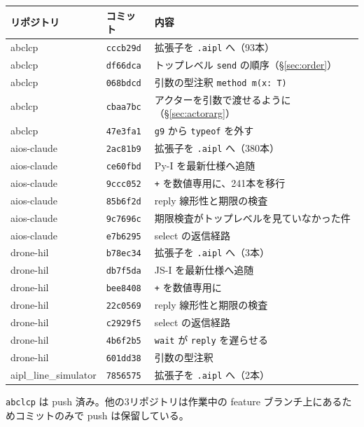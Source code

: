 \documentclass[11pt,a4paper]{ltjsarticle}
\begin{document}
\begin{center}
\small
\begin{longtable}{@{}lll@{}}
\toprule
リポジトリ & コミット & 内容 \\
\midrule
\endhead
abclcp & \texttt{cccb29d} & 拡張子を \texttt{.aipl} へ（93本）\\
abclcp & \texttt{df66dca} & トップレベル \texttt{send} の順序（\S\ref{sec:order}）\\
abclcp & \texttt{068bdcd} & 引数の型注釈 \verb|method m(x: T)| \\
abclcp & \texttt{cbaa7bc} & アクターを引数で渡せるように（\S\ref{sec:actorarg}）\\
abclcp & \texttt{47e3fa1} & \texttt{g9} から \texttt{typeof} を外す \\
\midrule
aios-claude & \texttt{2ac81b9} & 拡張子を \texttt{.aipl} へ（380本）\\
aios-claude & \texttt{ce60fbd} & Py-I を最新仕様へ追随 \\
aios-claude & \texttt{9ccc052} & \verb|+| を数値専用に、241本を移行 \\
aios-claude & \texttt{85b6f2d} & reply 線形性と期限の検査 \\
aios-claude & \texttt{9c7696c} & 期限検査がトップレベルを見ていなかった件 \\
aios-claude & \texttt{e7b6295} & select の返信経路 \\
\midrule
drone-hil & \texttt{b78ec34} & 拡張子を \texttt{.aipl} へ（3本）\\
drone-hil & \texttt{db7f5da} & JS-I を最新仕様へ追随 \\
drone-hil & \texttt{bee8408} & \verb|+| を数値専用に \\
drone-hil & \texttt{22c0569} & reply 線形性と期限の検査 \\
drone-hil & \texttt{c2929f5} & select の返信経路 \\
drone-hil & \texttt{4b6f2b5} & \texttt{wait} が \texttt{reply} を遅らせる \\
drone-hil & \texttt{601dd38} & 引数の型注釈 \\
\midrule
aipl\_line\_simulator & \texttt{7856575} & 拡張子を \texttt{.aipl} へ（2本）\\
\bottomrule
\end{longtable}
\end{center}

\noindent \texttt{abclcp} は push 済み。他の3リポジトリは作業中の feature
ブランチ上にあるためコミットのみで push は保留している。
\end{document}
